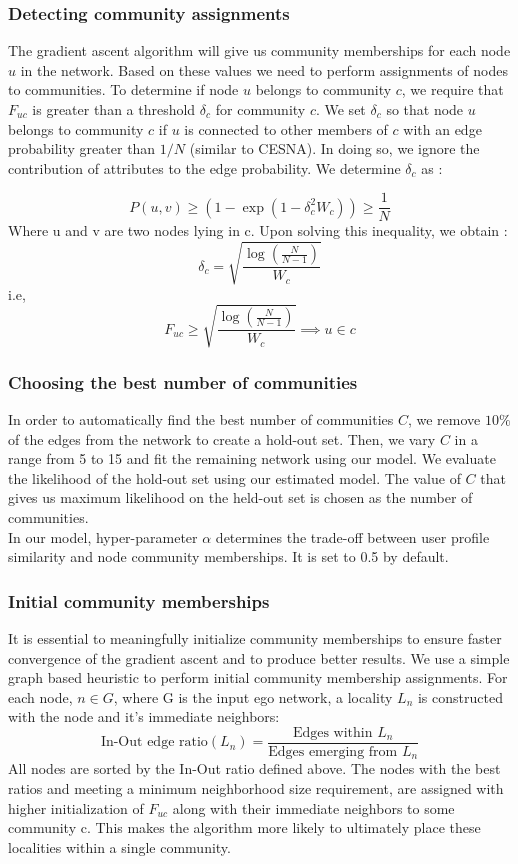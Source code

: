 \documentclass[11pt]{article}
\begin{document}
\subsubsection*{Detecting community assignments}
The gradient ascent algorithm will give us community memberships for each node $u$ in the network. Based on these values we need to perform assignments of nodes to communities. To determine if node $u$ belongs to community $c$, we require that $F_{uc}$ is greater than a threshold $\delta_c$ for community $c$. We set $\delta_c$ so that node $u$ belongs to community $c$ if $u$ is connected to other members of $c$ with an edge probability greater than $1/N$ (similar to CESNA). In doing so, we ignore the contribution of attributes to the edge probability. 
We determine $\delta_c$ as : 

\[P(u,v) \geq (1 - \exp(1 - \delta_c^2 W_c)) \geq \frac{1}{N} \]
Where u and v are two nodes lying in c. Upon solving this inequality, we obtain :
$$\delta_c = \sqrt{\frac{\log(\frac{N}{N-1})}{W_c}}$$
i.e,
$$F_{uc} \geq \sqrt{\frac{\log(\frac{N}{N-1})}{W_c}} \implies u \in c$$
\subsubsection*{Choosing the best number of communities}
In order to automatically find the best number of communities $C$, we remove $10 \%$ of the edges from the network to create a hold-out set. Then, we vary $C$ in a range from 5 to 15 and fit the remaining network using our model.  We evaluate the likelihood of the hold-out set using our estimated model. The value of $C$ that gives us maximum likelihood on the held-out set is chosen as the number of communities. \\[5pt]
In our model, hyper-parameter $\alpha$ determines the trade-off between user profile similarity and node community memberships. It is set to 0.5 by default. 

\subsubsection*{Initial community memberships}
It is essential to meaningfully initialize community memberships to ensure faster convergence of the gradient ascent and to produce better results. We use a simple graph based heuristic to perform initial community membership assignments. For each node, $n \in G$, where G is the input ego network, a locality $L_{n}$ is constructed with the node and it's immediate neighbors:
\\[5pt]
$$\text{In-Out edge ratio}(L_{n}) = \frac{\text{Edges within }L_{n}}{\text{Edges emerging from }L_{n}}$$
All nodes are sorted by the In-Out ratio defined above. The nodes with the best ratios and meeting a minimum neighborhood size requirement, are assigned with higher initialization of $F_{uc}$ along with their immediate neighbors to some community c. This makes the algorithm more likely to ultimately place these localities within a single community.
\end{document}
